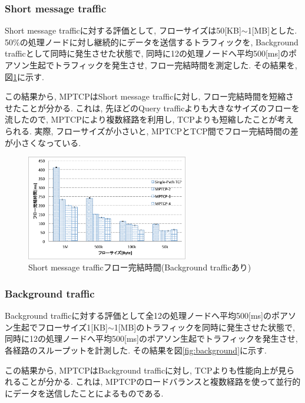 \subsubsection{Short message traffic}
Short message trafficに対する評価として, フローサイズは50[KB]$\sim$1[MB]とした.
50\%の処理ノードに対し継続的にデータを送信するトラフィックを, Background trafficとして同時に発生させた状態で,
同時に12の処理ノードへ平均500[ms]のポアソン生起でトラフィックを発生させ, フロー完結時間を測定した.
その結果を, 図\ref{fig:short_query}に示す.

この結果から, MPTCPはShort message trafficに対し, フロー完結時間を短縮させたことが分かる.
これは, 先ほどのQuery trafficよりも大きなサイズのフローを流したので, MPTCPにより複数経路を利用し, TCPよりも短縮したことが考えられる.
実際, フローサイズが小さいと, MPTCPとTCP間でフロー完結時間の差が小さくなっている.

\begin{figure}[t]
    \begin{center}
    \includegraphics[autoebb, width=200pt]{./img/mix_short.pdf}
    \caption{Short message trafficフロー完結時間(Background trafficあり)}
    \label{fig:short_query}
    \end{center}
\end{figure}


\subsubsection{Background traffic}
Background
trafficに対する評価として全12の処理ノードへ平均500[ms]のポアソン生起でフローサイズ1[KB]$\sim$1[MB]のトラフィックを同時に発生させた状態で,
同時に12の処理ノードへ平均500[ms]のポアソン生起でトラフィックを発生させ, 各経路のスループットを計測した.
その結果を図\ref{fig:background}に示す.

この結果から, MPTCPはBackground trafficに対し, TCPよりも性能向上が見られることが分かる.
これは, MPTCPのロードバランスと複数経路を使って並行的にデータを送信したことによるものである.

